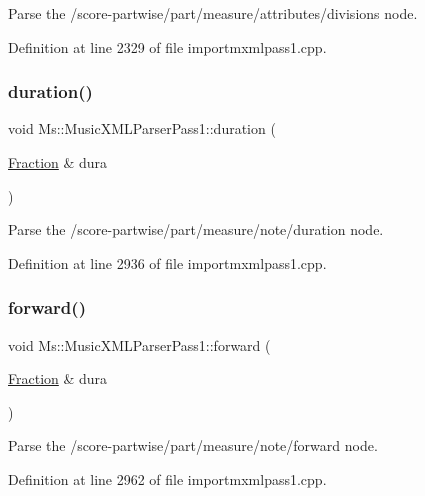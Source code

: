 Parse the /score-\/partwise/part/measure/attributes/divisions node. 

Definition at line 2329 of file importmxmlpass1.\+cpp.

\mbox{\label{class_ms_1_1_music_x_m_l_parser_pass1_ad2ecac228c9a223bf03c8d373a6be26c}} 
\subsubsection{\texorpdfstring{duration()}{duration()}}
{\footnotesize\ttfamily void Ms\+::\+Music\+X\+M\+L\+Parser\+Pass1\+::duration (\begin{DoxyParamCaption}\item[{\hyperlink{class_ms_1_1_fraction}{Fraction} \&}]{dura }\end{DoxyParamCaption})}

Parse the /score-\/partwise/part/measure/note/duration node. 

Definition at line 2936 of file importmxmlpass1.\+cpp.

\mbox{\label{class_ms_1_1_music_x_m_l_parser_pass1_a293da30da73224784aaf1e4228eea390}} 
\subsubsection{\texorpdfstring{forward()}{forward()}}
{\footnotesize\ttfamily void Ms\+::\+Music\+X\+M\+L\+Parser\+Pass1\+::forward (\begin{DoxyParamCaption}\item[{\hyperlink{class_ms_1_1_fraction}{Fraction} \&}]{dura }\end{DoxyParamCaption})}

Parse the /score-\/partwise/part/measure/note/forward node. 

Definition at line 2962 of file importmxmlpass1.\+cpp.

\mbox{\label{class_ms_1_1_music_x_m_l_parser_pass1_acd7c9663585dd1f7c57df0536ecad9ac}} 
